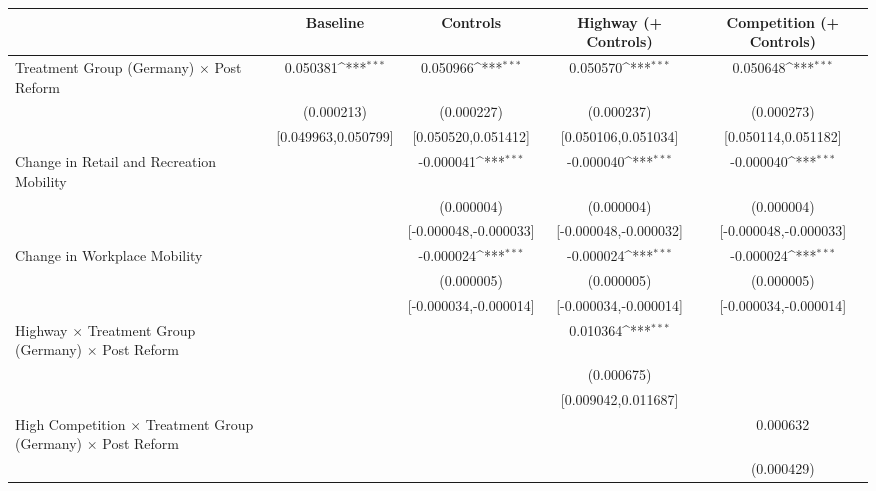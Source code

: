 {
\def\sym#1{\ifmmode^{#1}\else\(^{#1}\)\fi}
\begin{tabular}{l*{4}{c}}
\toprule
                    &\multicolumn{1}{c}{Baseline}&\multicolumn{1}{c}{Controls}&\multicolumn{1}{c}{Highway (+ Controls)}&\multicolumn{1}{c}{Competition (+ Controls)}\\
\midrule
Treatment Group (Germany) $\times$ Post Reform&    0.050381\sym{***}&    0.050966\sym{***}&    0.050570\sym{***}&    0.050648\sym{***}\\
                    &  (0.000213)         &  (0.000227)         &  (0.000237)         &  (0.000273)         \\
                    &[0.049963,0.050799]         &[0.050520,0.051412]         &[0.050106,0.051034]         &[0.050114,0.051182]         \\
Change in Retail and Recreation Mobility&                     &   -0.000041\sym{***}&   -0.000040\sym{***}&   -0.000040\sym{***}\\
                    &                     &  (0.000004)         &  (0.000004)         &  (0.000004)         \\
                    &                     &[-0.000048,-0.000033]         &[-0.000048,-0.000032]         &[-0.000048,-0.000033]         \\
Change in Workplace Mobility&                     &   -0.000024\sym{***}&   -0.000024\sym{***}&   -0.000024\sym{***}\\
                    &                     &  (0.000005)         &  (0.000005)         &  (0.000005)         \\
                    &                     &[-0.000034,-0.000014]         &[-0.000034,-0.000014]         &[-0.000034,-0.000014]         \\
Highway $\times$ Treatment Group (Germany) $\times$ Post Reform&                     &                     &    0.010364\sym{***}&                     \\
                    &                     &                     &  (0.000675)         &                     \\
                    &                     &                     &[0.009042,0.011687]         &                     \\
High Competition $\times$ Treatment Group (Germany) $\times$ Post Reform&                     &                     &                     &    0.000632         \\
                    &                     &                     &                     &  (0.000429)         \\

\end{tabular}}
